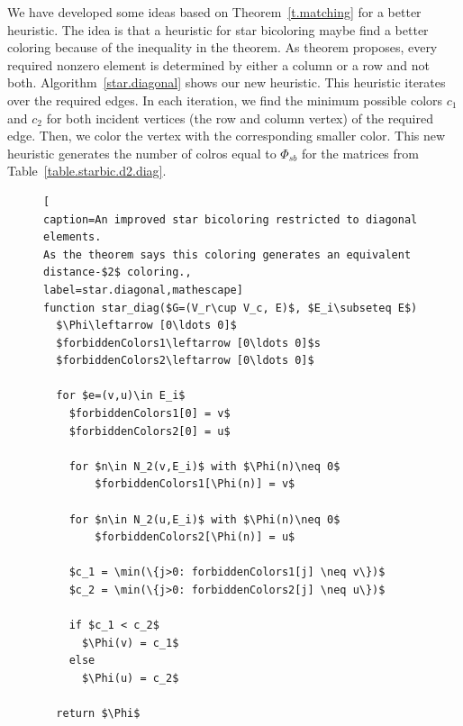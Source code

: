 \documentclass[12pt, twoside,a4paper,toc=bibliography]{scrbook}
\newcommand{\coderef}[1]{Algorithm~\protect\ref{#1}}
\begin{document}
We have developed some ideas based on Theorem~\ref{t.matching}
for a better heuristic. The idea is that a heuristic for star bicoloring maybe
find a better coloring because of the inequality in the theorem.
As theorem proposes, every required nonzero element
is determined by either a column or a row and not both. 
\coderef{star.diagonal} shows our new heuristic. This heuristic
iterates over the required edges.
In each iteration, we find the minimum possible colors $c_1$ and $c_2$
for both incident vertices (the row and column vertex) of the required edge.
Then, we color the vertex with the corresponding smaller color.
This new heuristic generates the number of colros equal to $\Phi_{sb}$
for the matrices from Table~\ref{table.starbic.d2.diag}.


\begin{figure}
\begin{lstlisting}[
caption=An improved star bicoloring restricted to diagonal elements.
As the theorem says this coloring generates an equivalent distance-$2$ coloring.,
label=star.diagonal,mathescape]
function star_diag($G=(V_r\cup V_c, E)$, $E_i\subseteq E$)
  $\Phi\leftarrow [0\ldots 0]$
  $forbiddenColors1\leftarrow [0\ldots 0]$s
  $forbiddenColors2\leftarrow [0\ldots 0]$
  
  for $e=(v,u)\in E_i$
    $forbiddenColors1[0] = v$
    $forbiddenColors2[0] = u$

    for $n\in N_2(v,E_i)$ with $\Phi(n)\neq 0$
        $forbiddenColors1[\Phi(n)] = v$

    for $n\in N_2(u,E_i)$ with $\Phi(n)\neq 0$
        $forbiddenColors2[\Phi(n)] = u$

    $c_1 = \min(\{j>0: forbiddenColors1[j] \neq v\})$
    $c_2 = \min(\{j>0: forbiddenColors2[j] \neq u\})$

    if $c_1 < c_2$
      $\Phi(v) = c_1$
    else
      $\Phi(u) = c_2$

  return $\Phi$
\end{lstlisting}
\end{figure}


\clearpage
\end{document}
